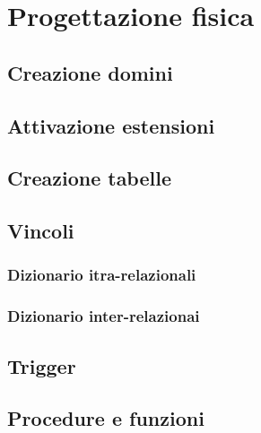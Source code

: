 \section{Progettazione fisica}
\subsection{Creazione domini}

\subsection{Attivazione estensioni}

\subsection{Creazione tabelle}

\subsection{Vincoli}
\subsubsection{Dizionario itra-relazionali}
\subsubsection{Dizionario inter-relazionai}

\subsection{Trigger}

\subsection{Procedure e funzioni}
